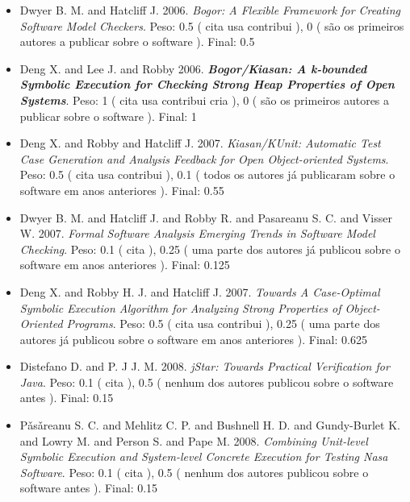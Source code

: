 \begin{itemize}
\item Dwyer B. M. and Hatcliff J.
      2006.
        \textit{ Bogor: A Flexible Framework for Creating Software Model Checkers}.
      Peso:
      0.5 (
          cita
          usa
          contribui
      ),
      0 (
são os primeiros autores a publicar sobre o software
      ).
      Final:
      0.5

\item Deng X. and Lee J. and Robby
      2006.
        \textbf{\textit{ Bogor/Kiasan: A k-bounded Symbolic Execution for Checking Strong Heap Properties of Open Systems}}.
      Peso:
      1 (
          cita
          usa
          contribui
          cria
      ),
      0 (
são os primeiros autores a publicar sobre o software
      ).
      Final:
      1

\item Deng X. and Robby and Hatcliff J.
      2007.
        \textit{ Kiasan/KUnit: Automatic Test Case Generation and Analysis Feedback for Open Object-oriented Systems}.
      Peso:
      0.5 (
          cita
          usa
          contribui
      ),
      0.1 (
todos os autores já publicaram sobre o software em anos anteriores
      ).
      Final:
      0.55

\item Dwyer B. M. and Hatcliff J. and Robby R. and Pasareanu S. C. and Visser W.
      2007.
        \textit{ Formal Software Analysis Emerging Trends in Software Model Checking}.
      Peso:
      0.1 (
          cita
      ),
      0.25 (
uma parte dos autores já publicou sobre o software em anos anteriores
      ).
      Final:
      0.125

\item Deng X. and Robby H. J. and Hatcliff J.
      2007.
        \textit{ Towards A Case-Optimal Symbolic Execution Algorithm for Analyzing Strong Properties of Object-Oriented Programs}.
      Peso:
      0.5 (
          cita
          usa
          contribui
      ),
      0.25 (
uma parte dos autores já publicou sobre o software em anos anteriores
      ).
      Final:
      0.625

\item Distefano D. and P. J J. M.
      2008.
        \textit{ jStar: Towards Practical Verification for Java}.
      Peso:
      0.1 (
          cita
      ),
      0.5 (
nenhum dos autores publicou sobre o software antes
      ).
      Final:
      0.15

\item P\v{a}s\v{a}reanu S. C. and Mehlitz C. P. and Bushnell H. D. and Gundy-Burlet K. and Lowry M. and Person S. and Pape M.
      2008.
        \textit{ Combining Unit-level Symbolic Execution and System-level Concrete Execution for Testing Nasa Software}.
      Peso:
      0.1 (
          cita
      ),
      0.5 (
nenhum dos autores publicou sobre o software antes
      ).
      Final:
      0.15


\end{itemize}
